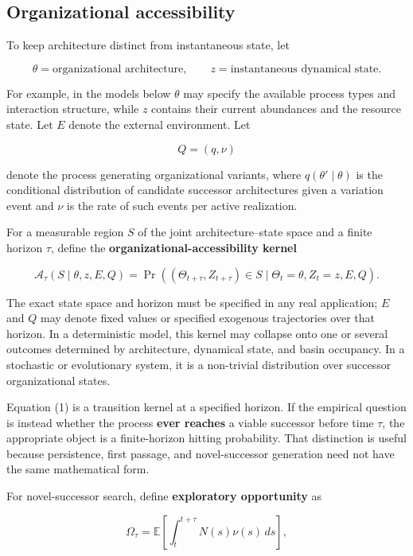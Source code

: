 \documentclass[11pt,a4paper]{article}
\begin{document}
\subsection{Organizational
accessibility}\label{organizational-accessibility}

To keep architecture distinct from instantaneous state, let

\[
\theta=\text{organizational architecture},
\qquad
z=\text{instantaneous dynamical state}.
\]

For example, in the models below \(\theta\) may specify the available
process types and interaction structure, while \(z\) contains their
current abundances and the resource state. Let \(E\) denote the external
environment. Let

\[
Q=(q,\nu)
\]

denote the process generating organizational variants, where
\(q(\theta'\mid\theta)\) is the conditional distribution of candidate
successor architectures given a variation event and \(\nu\) is the rate
of such events per active realization.

For a measurable region \(S\) of the joint architecture--state space and
a finite horizon \(\tau\), define the
\textbf{organizational-accessibility kernel}

\[
\boxed{
\mathcal A_\tau(S\mid\theta,z,E,Q)
=
\Pr\!\left(
(\Theta_{t+\tau},Z_{t+\tau})\in S
\mid
\Theta_t=\theta,
Z_t=z,
E,Q
\right).
}
\tag{1}
\]

The exact state space and horizon must be specified in any real
application; \(E\) and \(Q\) may denote fixed values or specified
exogenous trajectories over that horizon. In a deterministic model, this
kernel may collapse onto one or several outcomes determined by
architecture, dynamical state, and basin occupancy. In a stochastic or
evolutionary system, it is a non-trivial distribution over successor
organizational states.

Equation (1) is a transition kernel at a specified horizon. If the
empirical question is instead whether the process \textbf{ever reaches}
a viable successor before time \(\tau\), the appropriate object is a
finite-horizon hitting probability. That distinction is useful because
persistence, first passage, and novel-successor generation need not have
the same mathematical form.

For novel-successor search, define \textbf{exploratory opportunity} as

\[
\boxed{
\Omega_\tau
=
\mathbb E\!\left[
\int_t^{t+\tau}N(s)\nu(s)\,ds
\right],
}
\tag{2}
\]
\end{document}
